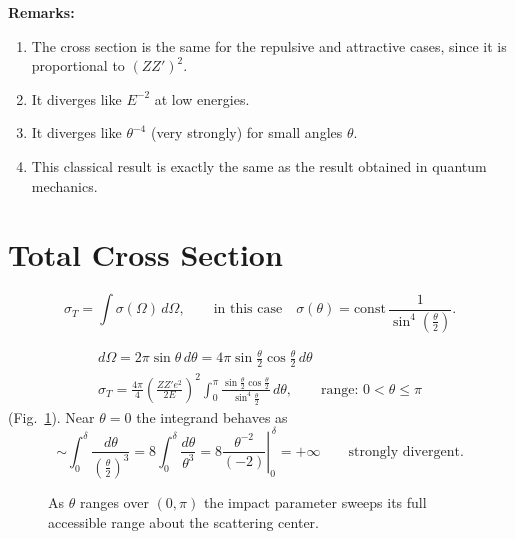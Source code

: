 \documentclass[11pt]{article}
\newcommand{\Om}{\Omega}
\newcommand{\half}[1]{\tfrac{#1}{2}}
\begin{document}
\noindent\textbf{Remarks:}
\begin{enumerate}[label=\arabic*)]
\item The cross section is the same for the repulsive and attractive cases,
      since it is proportional to $(ZZ')^{2}$.
\item It diverges like $E^{-2}$ at low energies.
\item It diverges like $\theta^{-4}$ (very strongly) for small angles $\theta$.
\item This classical result is exactly the same as the result obtained in
      quantum mechanics.
\end{enumerate}

\section{Total Cross Section}

\begin{equation}
\sigma_{T} = \int \sigma(\Om)\,d\Om ,
\qquad\text{in this case}\quad
\sigma(\theta) = \text{const}\,\frac{1}{\sin^{4}\!\left(\frac{\theta}{2}\right)} .
\end{equation}

\begin{gather}
d\Om = 2\pi\sin\theta\,d\theta = 4\pi\sin\half{\theta}\cos\half{\theta}\,d\theta\\[4pt]
\sigma_{T} = \frac{4\pi}{4}\left(\frac{Z Z' e^{2}}{2E}\right)^{\!2}
  \int_{0}^{\pi}
  \frac{\sin\frac{\theta}{2}\cos\frac{\theta}{2}}{\sin^{4}\frac{\theta}{2}}\,d\theta,
\qquad \text{range: } 0 < \theta \le \pi
\end{gather}
(Fig.~\ref{fig:centre}). Near $\theta = 0$ the integrand behaves as
\begin{equation}
\sim \int_{0}^{\delta}\frac{d\theta}{\left(\frac{\theta}{2}\right)^{3}}
 = 8\int_{0}^{\delta}\frac{d\theta}{\theta^{3}}
 = 8\left.\frac{\theta^{-2}}{(-2)}\right|_{0}^{\,\delta} = +\infty
\qquad \text{strongly divergent}.
\end{equation}

\begin{figure}[htbp]
\centering
{}
\caption{As $\theta$ ranges over $(0,\pi)$ the impact parameter sweeps its
full accessible range about the scattering center.}
\label{fig:centre}
\end{figure}
\end{document}
